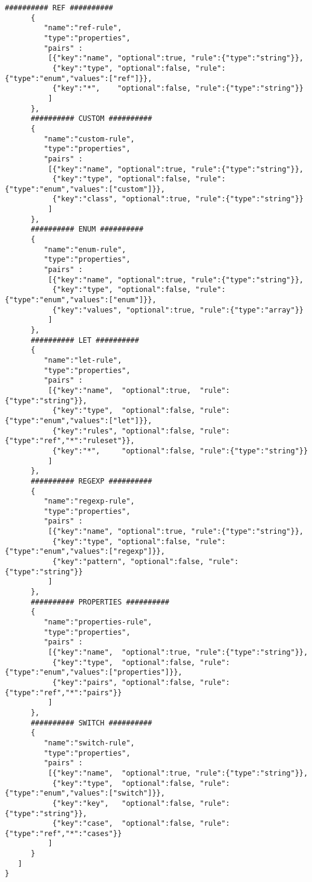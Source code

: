 \documentclass[a4paper]{article}
\begin{document}
\begin{lstlisting}[basicstyle=\ttfamily\scriptsize{}]
      ########## REF ##########
      {
         "name":"ref-rule",
         "type":"properties",
         "pairs" :
          [{"key":"name", "optional":true, "rule":{"type":"string"}},
           {"key":"type", "optional":false, "rule":{"type":"enum","values":["ref"]}},
           {"key":"*",    "optional":false, "rule":{"type":"string"}}
          ]
      },
      ########## CUSTOM ##########
      {
         "name":"custom-rule",
         "type":"properties",
         "pairs" :
          [{"key":"name", "optional":true, "rule":{"type":"string"}},
           {"key":"type", "optional":false, "rule":{"type":"enum","values":["custom"]}},
           {"key":"class", "optional":true, "rule":{"type":"string"}}
          ]
      },
      ########## ENUM ##########
      {
         "name":"enum-rule",
         "type":"properties",
         "pairs" :
          [{"key":"name", "optional":true, "rule":{"type":"string"}},
           {"key":"type", "optional":false, "rule":{"type":"enum","values":["enum"]}},
           {"key":"values", "optional":true, "rule":{"type":"array"}}
          ]
      },
      ########## LET ##########
      {
         "name":"let-rule",
         "type":"properties",
         "pairs" :
          [{"key":"name",  "optional":true,  "rule":{"type":"string"}},
           {"key":"type",  "optional":false, "rule":{"type":"enum","values":["let"]}},
           {"key":"rules", "optional":false, "rule":{"type":"ref","*":"ruleset"}},
           {"key":"*",     "optional":false, "rule":{"type":"string"}}
          ]
      },
      ########## REGEXP ##########
      {
         "name":"regexp-rule",
         "type":"properties",
         "pairs" :
          [{"key":"name", "optional":true, "rule":{"type":"string"}},
           {"key":"type", "optional":false, "rule":{"type":"enum","values":["regexp"]}},
           {"key":"pattern", "optional":false, "rule":{"type":"string"}}
          ]
      },
      ########## PROPERTIES ##########
      {
         "name":"properties-rule",
         "type":"properties",
         "pairs" :
          [{"key":"name",  "optional":true, "rule":{"type":"string"}},
           {"key":"type",  "optional":false, "rule":{"type":"enum","values":["properties"]}},
           {"key":"pairs", "optional":false, "rule":{"type":"ref","*":"pairs"}}
          ]
      },
      ########## SWITCH ##########
      {
         "name":"switch-rule",
         "type":"properties",
         "pairs" :
          [{"key":"name",  "optional":true, "rule":{"type":"string"}},
           {"key":"type",  "optional":false, "rule":{"type":"enum","values":["switch"]}},
           {"key":"key",   "optional":false, "rule":{"type":"string"}},
           {"key":"case",  "optional":false, "rule":{"type":"ref","*":"cases"}}
          ]
      }
   ]
}
\end{lstlisting}
\end{document}
